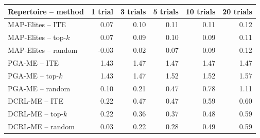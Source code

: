 \begin{tabular}{lrrrrr}
\toprule
Repertoire -- method & 1 trial & 3 trials & 5 trials & 10 trials & 20 trials \\
\midrule
MAP-Elites -- ITE & 0.07 & 0.10 & 0.11 & 0.11 & 0.12 \\
MAP-Elites -- top-$k$ & 0.07 & 0.09 & 0.10 & 0.09 & 0.11 \\
MAP-Elites -- random & -0.03 & 0.02 & 0.07 & 0.09 & 0.12 \\
PGA-ME -- ITE & 1.43 & 1.47 & 1.47 & 1.47 & 1.47 \\
PGA-ME -- top-$k$ & 1.43 & 1.47 & 1.52 & 1.52 & 1.57 \\
PGA-ME -- random & 0.10 & 0.21 & 0.47 & 0.78 & 1.11 \\
DCRL-ME -- ITE & 0.22 & 0.47 & 0.47 & 0.59 & 0.60 \\
DCRL-ME -- top-$k$ & 0.22 & 0.36 & 0.37 & 0.48 & 0.59 \\
DCRL-ME -- random & 0.03 & 0.22 & 0.28 & 0.49 & 0.59 \\
\bottomrule
\end{tabular}
